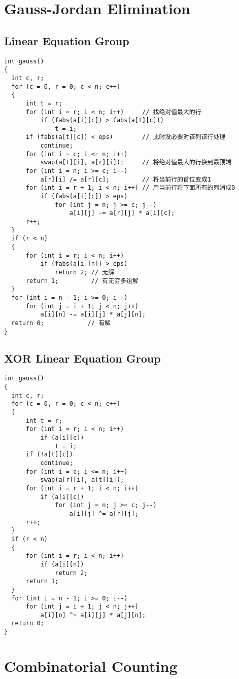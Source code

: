 \section{Gauss-Jordan Elimination}
\subsection{Linear Equation Group}
\begin{lstlisting}
int gauss()
{
  int c, r;
  for (c = 0, r = 0; c < n; c++)
  {
      int t = r;
      for (int i = r; i < n; i++)     // 找绝对值最大的行
          if (fabs(a[i][c]) > fabs(a[t][c]))
              t = i;
      if (fabs(a[t][c]) < eps)        // 此时没必要对该列该行处理
          continue;
      for (int i = c; i <= n; i++)
          swap(a[t][i], a[r][i]);     // 将绝对值最大的行换到最顶端
      for (int i = n; i >= c; i--)
          a[r][i] /= a[r][c];         // 将当前行的首位变成1
      for (int i = r + 1; i < n; i++) // 用当前行将下面所有的列消成0
          if (fabs(a[i][c]) > eps)
              for (int j = n; j >= c; j--)
                  a[i][j] -= a[r][j] * a[i][c];
      r++;
  }
  if (r < n)
  {
      for (int i = r; i < n; i++)
          if (fabs(a[i][n]) > eps)
              return 2; // 无解
      return 1;         // 有无穷多组解
  }
  for (int i = n - 1; i >= 0; i--)
      for (int j = i + 1; j < n; j++)
          a[i][n] -= a[i][j] * a[j][n];
  return 0;            // 有解
}
\end{lstlisting}
\subsection{XOR Linear Equation Group}
\begin{lstlisting}
int gauss()
{
  int c, r;
  for (c = 0, r = 0; c < n; c++)
  {
      int t = r;
      for (int i = r; i < n; i++)
          if (a[i][c])
              t = i;
      if (!a[t][c])
          continue;
      for (int i = c; i <= n; i++)
          swap(a[r][i], a[t][i]);
      for (int i = r + 1; i < n; i++)
          if (a[i][c])
              for (int j = n; j >= c; j--)
                  a[i][j] ^= a[r][j];
      r++;
  }
  if (r < n)
  {
      for (int i = r; i < n; i++)
          if (a[i][n])
              return 2;
      return 1;
  }
  for (int i = n - 1; i >= 0; i--)
      for (int j = i + 1; j < n; j++)
          a[i][n] ^= a[i][j] * a[j][n];
  return 0;
}
\end{lstlisting}
\section{Combinatorial Counting}
